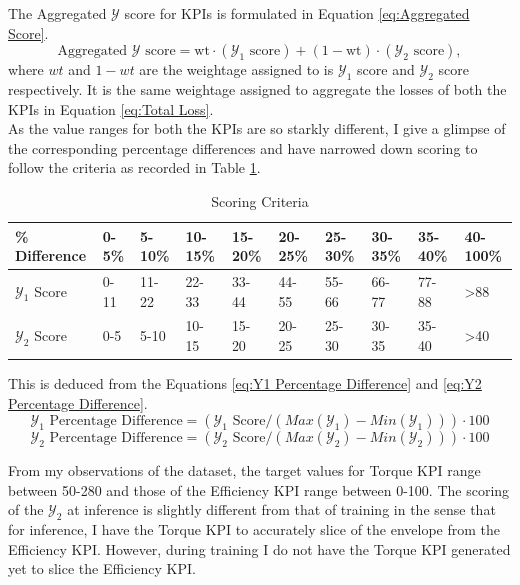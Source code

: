 \documentclass{report} %
\begin{document}
The Aggregated $\mathcal{Y}$ score for \ac{KPI}s is formulated in Equation \ref{eq:Aggregated Score}.
\begin{equation}
    \text{Aggregated $\mathcal{Y}$ score} = \text{wt} \cdot (\text{$\mathcal{Y}_1$ score}) + (1-\text{wt}) \cdot (\text{$\mathcal{Y}_2$ score}),
    \label{eq:Aggregated Score}
\end{equation}
where $wt$ and  $1-wt$ are the weightage assigned to is $\mathcal{Y}_1$ score and $\mathcal{Y}_2$ score respectively. 
It is the same weightage assigned to aggregate the losses of both the \ac{KPI}s in Equation \ref{eq:Total Loss}.\\

As the value ranges for both the \ac{KPI}s are so starkly different, I give a glimpse of the corresponding percentage differences and have narrowed down scoring to 
follow the criteria as recorded in Table \ref{tab:Scoring Criteria}.
\begin{table}[H]
    \centering
    \begin{tabularx}{1\linewidth}{|X|X|X|X|X|X|X|X|X|X|}
    \hline {\bf \% Difference} & {\bf 0-5\%} & {\bf 5-10\%} & {\bf 10-15\%} & {\bf 15-20\%} & {\bf 20-25\%} & {\bf 25-30\%} & {\bf 30-35\%} & {\bf 35-40\%} & {\bf 40-100\%}\\
    \hline 
    $\mathcal{Y}_1$ Score& 0-11& 11-22 & 22-33 & 33-44 & 44-55& 55-66 & 66-77 & 77-88 & \textgreater 88\\
    $\mathcal{Y}_2$ Score& 0-5 & 5-10 & 10-15 & 15-20 & 20-25& 25-30 & 30-35 & 35-40 &\textgreater 40\\
    \hline
    \end{tabularx}
    \caption{Scoring Criteria}
    \label{tab:Scoring Criteria}
\end{table}

This is deduced from the Equations \ref{eq:Y1 Percentage Difference} and \ref{eq:Y2 Percentage Difference}.
\begin{equation}
    \text{$\mathcal{Y}_1$ Percentage Difference} = (\text{$\mathcal{Y}_1$ Score} / {(Max(\mathcal{Y}_1) - Min(\mathcal{Y}_1))})  \cdot 100
    \label{eq:Y1 Percentage Difference}
\end{equation}
\begin{equation}
    \text{$\mathcal{Y}_2$ Percentage Difference} = (\text{$\mathcal{Y}_2$ Score} / {(Max(\mathcal{Y}_2) - Min(\mathcal{Y}_2))})  \cdot 100
    \label{eq:Y2 Percentage Difference}
\end{equation}

From my observations of the dataset, the target values for Torque \ac{KPI} range between 50-280 and those of the Efficiency \ac{KPI} range between 0-100.
The scoring of the $\mathcal{Y}_2$ at inference is slightly different from that of training in the sense that for inference, I have the Torque \ac{KPI} to 
accurately slice of the envelope from the Efficiency \ac{KPI}. However, during training I do not have the Torque \ac{KPI} generated yet to slice the Efficiency \ac{KPI}.
\end{document}
